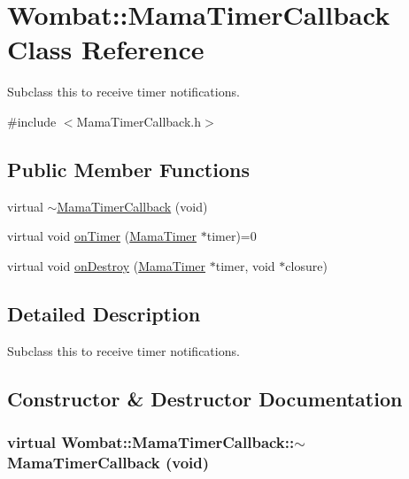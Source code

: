 \hypertarget{classWombat_1_1MamaTimerCallback}{
\section{Wombat::MamaTimerCallback Class Reference}
\label{classWombat_1_1MamaTimerCallback}
}


Subclass this to receive timer notifications.  


{\ttfamily \#include $<$MamaTimerCallback.h$>$}\subsection*{Public Member Functions}
\begin{DoxyCompactItemize}
\item 
virtual \hyperlink{classWombat_1_1MamaTimerCallback_aee32d5f46260fd38e865cd0ec29698e3}{$\sim$MamaTimerCallback} (void)
\item 
virtual void \hyperlink{classWombat_1_1MamaTimerCallback_af0ba2499053f2302fab309a1fdb30920}{onTimer} (\hyperlink{classWombat_1_1MamaTimer}{MamaTimer} $\ast$timer)=0
\item 
virtual void \hyperlink{classWombat_1_1MamaTimerCallback_a7e2e85ffd45910d1bf377cefd7ea6b0f}{onDestroy} (\hyperlink{classWombat_1_1MamaTimer}{MamaTimer} $\ast$timer, void $\ast$closure)
\end{DoxyCompactItemize}


\subsection{Detailed Description}
Subclass this to receive timer notifications. 

\subsection{Constructor \& Destructor Documentation}
\hypertarget{classWombat_1_1MamaTimerCallback_aee32d5f46260fd38e865cd0ec29698e3}{
\subsubsection[{$\sim$MamaTimerCallback}]{\setlength{\rightskip}{0pt plus 5cm}virtual Wombat::MamaTimerCallback::$\sim$MamaTimerCallback (void)}}
\label{classWombat_1_1MamaTimerCallback_aee32d5f46260fd38e865cd0ec29698e3}


